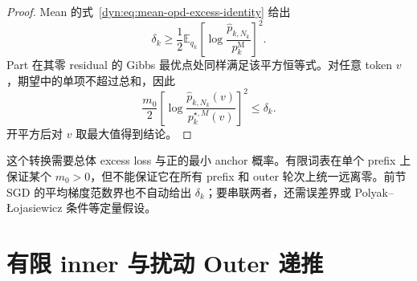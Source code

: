 \documentclass[lang=cn,scheme=chinese,openany]{../book/elegantbook}
\newcommand{\E}{\mathbb E}
\begin{document}
\begin{proof}
Mean 的式~\eqref{dyn:eq:mean-opd-excess-identity} 给出
\begin{equation*}
 \delta_k\geq\frac12\E_{q_k}
 \left[\log\frac{\widehat p_{k,N_k}}{p_k^{\mathrm M}}\right]^2.
\end{equation*}
Part 在其零 residual 的 Gibbs 最优点处同样满足该平方恒等式。对任意 token $v$，期望中的单项不超过总和，因此
\begin{equation*}
 \frac{m_0}{2}
 \left[\log\frac{\widehat p_{k,N_k}(v)}{p_k^{\star,M}(v)}\right]^2
 \leq\delta_k.
\end{equation*}
开平方后对 $v$ 取最大值得到结论。
\end{proof}

这个转换需要总体 excess loss 与正的最小 anchor 概率。有限词表在单个 prefix 上保证某个 $m_0>0$，但不能保证它在所有 prefix 和 outer 轮次上统一远离零。前节 SGD 的平均梯度范数界也不自动给出 $\delta_k$；要串联两者，还需误差界或 Polyak--Łojasiewicz 条件等定量假设。

\section{有限 inner 与扰动 Outer 递推}
\end{document}
